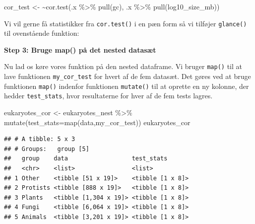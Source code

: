 \documentclass[
]{book}
\newenvironment{Shaded}{\begin{snugshade}}{\end{snugshade}}
\newcommand{\AttributeTok}[1]{\textcolor[rgb]{0.77,0.63,0.00}{#1}}
\newcommand{\ErrorTok}[1]{\textcolor[rgb]{0.64,0.00,0.00}{\textbf{#1}}}
\newcommand{\FunctionTok}[1]{\textcolor[rgb]{0.00,0.00,0.00}{#1}}
\newcommand{\NormalTok}[1]{#1}
\newcommand{\OtherTok}[1]{\textcolor[rgb]{0.56,0.35,0.01}{#1}}
\newcommand{\SpecialCharTok}[1]{\textcolor[rgb]{0.00,0.00,0.00}{#1}}
\begin{document}
\begin{Shaded}
\begin{Highlighting}[]
\NormalTok{cor\_test }\OtherTok{\textless{}{-}} \ErrorTok{\textasciitilde{}}\FunctionTok{cor.test}\NormalTok{(.x }\SpecialCharTok{\%\textgreater{}\%} \FunctionTok{pull}\NormalTok{(gc),}
\NormalTok{                      .x }\SpecialCharTok{\%\textgreater{}\%} \FunctionTok{pull}\NormalTok{(log10\_size\_mb))}
\end{Highlighting}
\end{Shaded}

Vi vil gerne få statistikker fra \texttt{cor.test()} i en pæn form så vi tilføjer \texttt{glance()} til ovenstående funktion:

\begin{Shaded}
\end{Shaded}

\textbf{Step 3: Bruge map() på det nested datasæt}

Nu lad os køre vores funktion på den nested dataframe. Vi bruger \texttt{map()} til at lave funktionen \texttt{my\_cor\_test} for hvert af de fem datasæt. Det gøres ved at bruge funktionen \texttt{map()} indenfor funktionen \texttt{mutate()} til at oprette en ny kolonne, der hedder \texttt{test\_stats}, hvor resultaterne for hver af de fem tests lagres.

\begin{Shaded}
\begin{Highlighting}[]
\NormalTok{eukaryotes\_cor }\OtherTok{\textless{}{-}}\NormalTok{ eukaryotes\_nest }\SpecialCharTok{\%\textgreater{}\%} 
  \FunctionTok{mutate}\NormalTok{(}\AttributeTok{test\_stats=}\FunctionTok{map}\NormalTok{(data,my\_cor\_test))}
\NormalTok{eukaryotes\_cor}
\end{Highlighting}
\end{Shaded}

\begin{verbatim}
## # A tibble: 5 x 3
## # Groups:   group [5]
##   group    data                  test_stats      
##   <chr>    <list>                <list>          
## 1 Other    <tibble [51 x 19]>    <tibble [1 x 8]>
## 2 Protists <tibble [888 x 19]>   <tibble [1 x 8]>
## 3 Plants   <tibble [1,304 x 19]> <tibble [1 x 8]>
## 4 Fungi    <tibble [6,064 x 19]> <tibble [1 x 8]>
## 5 Animals  <tibble [3,201 x 19]> <tibble [1 x 8]>
\end{verbatim}
\end{document}
